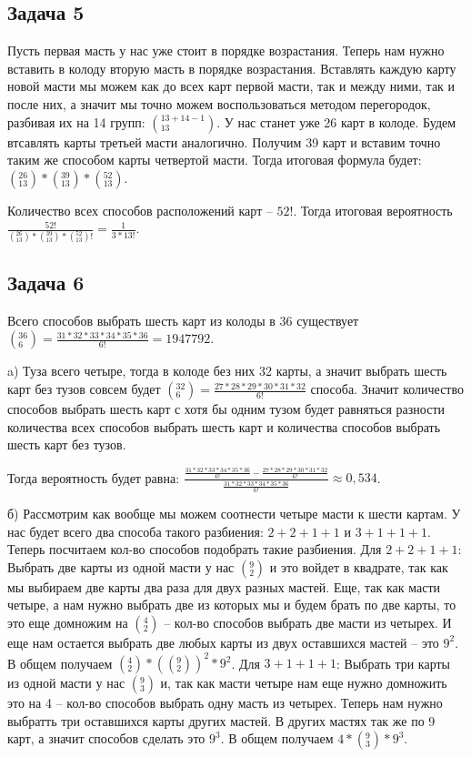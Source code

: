 	\subsection{Задача 5}
	Пусть первая масть у нас уже стоит в порядке возрастания. Теперь нам нужно вставить в колоду вторую масть в порядке возрастания. Вставлять каждую карту новой масти мы можем как до всех карт первой масти, так и между ними, так и после них, а значит мы точно можем воспользоваться методом перегородок, разбивая их на 14 групп: $\left(_{13}^{13 + 14 - 1}\right)$. 
	У нас станет уже 26 карт в колоде. Будем втсавлять карты третьей масти аналогично. Получим 39 карт и вставим точно таким же способом карты четвертой масти. Тогда итоговая формула будет:  $\left(_{13}^{26}\right) * \left(_{13}^{39}\right) * \left(_{13}^{52}\right)$.
	
	Количество всех способов расположений карт -- $52!$.
	Тогда итоговая вероятность $\frac{52!}{\left(_{13}^{26}\right) * \left(_{13}^{39}\right) * \left(_{13}^{52}\right)!} = \frac{1}{3*13!}$.
	
	\subsection{Задача 6}
	Всего способов выбрать шесть карт из колоды в 36 существует $\left(_{6}^{36}\right) = \frac{31 * 32 * 33 * 34 * 35 * 36}{6!} = 1947792$.
	
	a) Туза всего четыре, тогда в колоде без них 32 карты, а значит выбрать шесть карт без тузов совсем будет $\left(_{6}^{32}\right) = \frac{27 * 28 * 29* 30 * 31 * 32}{6!}$ способа. Значит количество способов выбрать шесть карт с хотя бы одним тузом будет равняться разности количества всех способов выбрать шесть карт и количества способов выбрать шесть карт без тузов.
	
	Тогда вероятность будет равна: $\frac{\frac{31 * 32 * 33 * 34 * 35 * 36}{6!} - \frac{27 * 28 * 29* 30 * 31 * 32}{6!}}{\frac{31 * 32 * 33 * 34 * 35 * 36}{6!}} \approx 0,534$.
	
	б) Рассмотрим как вообще мы можем соотнести четыре масти к шести картам. У нас будет всего два способа такого разбиения: $2+2+1+1$ и $3+1+1+1$. 
	Теперь посчитаем кол-во способов подобрать такие разбиения. 
	Для $2+2+1+1$: Выбрать две карты из одной масти у нас $\left(_{2}^{9}\right)$ и это войдет в квадрате, так как мы выбираем две карты два раза для двух разных мастей. Еще, так как масти четыре, а нам нужно выбрать две из которых мы и будем брать по две карты, то это еще домножим на $\left(_{2}^{4}\right)$ -- кол-во способов выбрать две масти из четырех. И еще нам остается выбрать две любых карты из двух оставшихся мастей -- это $9^2$. В общем получаем $\left(_{2}^{4}\right) * (\left(_{2}^{9}\right))^2*9^2$. 
	Для $3+1+1+1$: Выбрать три карты из одной масти у нас $\left(_{3}^{9}\right)$ и, так как масти четыре нам еще нужно домножить это на 4 -- кол-во способов выбрать одну масть из четырех. Теперь нам нужно выбратть три оставшихся карты других мастей. В других мастях так же по 9 карт, а значит способов сделать это $9^3$. В общем получаем $4 * \left(_{3}^{9}\right) * 9^3$.
	
